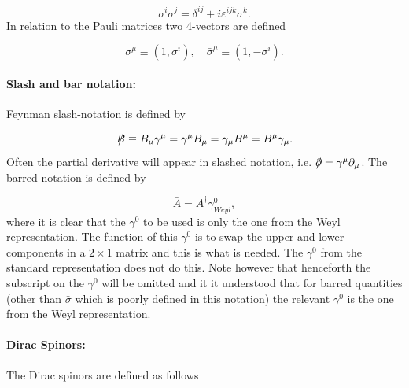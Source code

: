 \begin{equation}
	\sigma^i \sigma^j=\delta^{ij}+i\varepsilon^{ijk}\sigma^k.
\end{equation} 
In relation to the Pauli matrices two 4-vectors are defined

\begin{equation}
	\sigma^\mu\equiv (1,\sigma^i), \quad \bar{ \sigma}^\mu\equiv (1,-\sigma^i).
\end{equation} 

\paragraph{Slash and bar notation:}
Feynman slash-notation is defined by

\begin{equation}
	\slashed B \equiv B_\mu\gamma^\mu=\gamma^\mu B_\mu=\gamma_\mu B^\mu=B^\mu\gamma_\mu.
\end{equation} 
Often the partial derivative will appear in slashed notation, i.e. $\slashed \partial =\gamma^\mu\partial _\mu$. The barred notation is defined by

\begin{equation}
	\bar{A}=A^\dagger \gamma^0_{Weyl},
\end{equation} 
where it is clear that the $\gamma^0$ to be used is only the one from the Weyl representation. The function of this $\gamma^0$ is to swap the upper and lower components in a $2\times 1$ matrix and this is what is needed. The $\gamma^0$ from the standard representation does not do this. Note however that henceforth the subscript on the $\gamma^0$ will be omitted and it it understood that for barred quantities (other than $\bar{\sigma}$ which is poorly defined in this notation) the relevant $\gamma^0$ is the one from the Weyl representation.

\paragraph{Dirac Spinors:} The Dirac spinors are defined as follows

